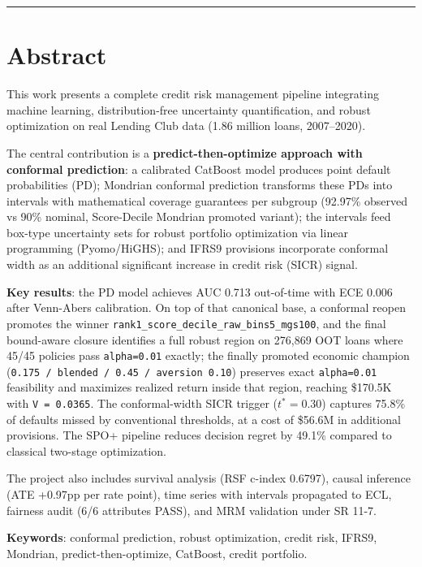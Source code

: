 \documentclass[
  spanish,
  11pt,
  letterpaper,
]{scrbook}
\theoremstyle{plain}
\theoremstyle{remark}
\begin{document}
\begin{center}\rule{0.5\linewidth}{0.5pt}\end{center}

\section*{Abstract}\label{abstract}


This work presents a complete credit risk management pipeline
integrating machine learning, distribution-free uncertainty
quantification, and robust optimization on real Lending Club data (1.86
million loans, 2007--2020).

The central contribution is a \textbf{predict-then-optimize approach
with conformal prediction}: a calibrated CatBoost model produces point
default probabilities (PD); Mondrian conformal prediction transforms
these PDs into intervals with mathematical coverage guarantees per
subgroup (92.97\% observed vs 90\% nominal, Score-Decile Mondrian
promoted variant); the intervals feed box-type uncertainty sets for
robust portfolio optimization via linear programming (Pyomo/HiGHS); and
IFRS9 provisions incorporate conformal width as an additional
significant increase in credit risk (SICR) signal.

\textbf{Key results}: the PD model achieves AUC 0.713 out-of-time with
ECE 0.006 after Venn-Abers calibration. On top of that canonical base, a
conformal reopen promotes the winner
\texttt{rank1\_score\_decile\_raw\_bins5\_mgs100}, and the final
bound-aware closure identifies a full robust region on 276,869 OOT loans
where 45/45 policies pass \texttt{alpha=0.01} exactly; the finally
promoted economic champion
(\texttt{0.175\ /\ blended\ /\ 0.45\ /\ aversion\ 0.10}) preserves exact
\texttt{alpha=0.01} feasibility and maximizes realized return inside
that region, reaching \$170.5K with \texttt{V\ =\ 0.0365}. The
conformal-width SICR trigger (\(t^* = 0.30\)) captures 75.8\% of
defaults missed by conventional thresholds, at a cost of \$56.6M in
additional provisions. The SPO+ pipeline reduces decision regret by
49.1\% compared to classical two-stage optimization.

The project also includes survival analysis (RSF c-index 0.6797), causal
inference (ATE +0.97pp per rate point), time series with intervals
propagated to ECL, fairness audit (6/6 attributes PASS), and MRM
validation under SR 11-7.

\textbf{Keywords}: conformal prediction, robust optimization, credit
risk, IFRS9, Mondrian, predict-then-optimize, CatBoost, credit
portfolio.
\end{document}
